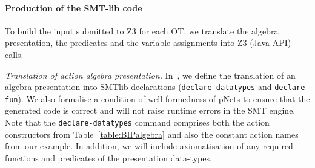 \documentclass[smallcondensed]{svjour3}
\newcommand{\noteSB}[2][color=green!40, size=\tiny]{\todo[#1]{{\bf Simon: } {#2}}}
\begin{document}

\paragraph{Production of the SMT-lib code}
  To build the input submitted to Z3 for each OT,
we translate the algebra presentation, the predicates and the
variable assignments into Z3 (Java-API) calls.

\emph{Translation of action algebra presentation.}
In~\cite{AVOCS18}, we  define the translation of an algebra presentation into
SMTlib declarations (\texttt{declare-datatypes} and
\texttt{declare-fun}). We also formalise a condition of well-formedness of pNets to ensure that the generated code is correct
and will not raise runtime errors in the SMT engine. Note that the
\texttt{declare-datatypes} command comprises both the action
constructors from Table~\ref{table:BIPalgebra} and also the constant action
names from our example.
In addition, we will include axiomatisation of any required functions
and predicates of the presentation data-types.


\end{document}
